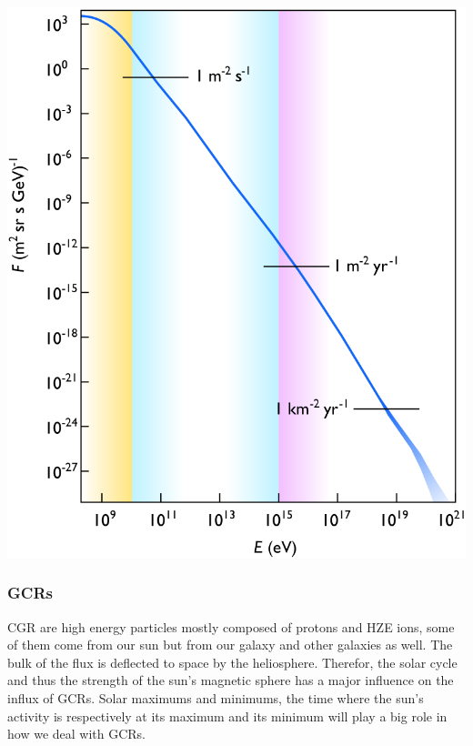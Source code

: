 \documentclass[12pt,a4paper]{report}
\begin{document}
\begin{minipage}[b]{0.55\linewidth}
\centering
\includegraphics[scale=.25]{img/Cosmic_ray_flux_versus_particle_energy.svg.png}
\end{minipage}
\hfill
\begin{minipage}[b]{0.35\linewidth}
\subsubsection{GCRs}
CGR are high energy particles mostly composed of protons and HZE ions, some of them come from our sun but from our galaxy and other galaxies as well. The bulk of the flux is deflected to space by the heliosphere. Therefor, the solar cycle and thus the strength of the sun's magnetic sphere has a major influence on the influx of GCRs.
Solar maximums and minimums, the time where the sun's activity is respectively at its maximum and its minimum will play a big role in how we deal with GCRs.
\end{minipage}
\end{document}
